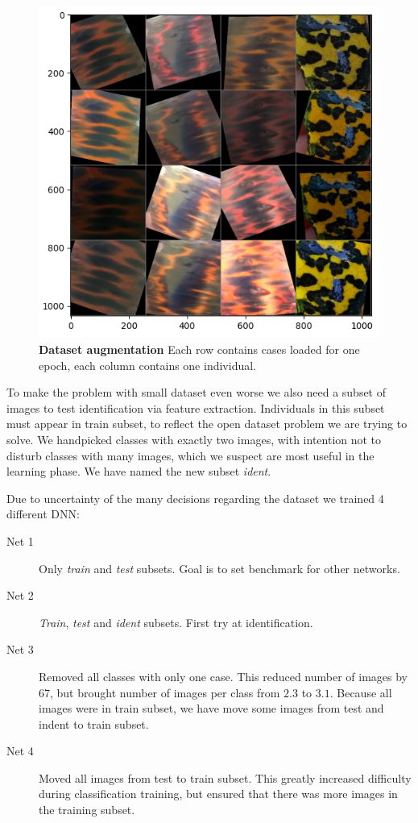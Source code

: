 \documentclass[fleqn,moreauthors,10pt]{ds_report}
\begin{document}
\begin{figure}[htb]\centering
	\includegraphics[width=0.8\linewidth]{augmentation.png}
	\caption{\textbf{Dataset augmentation} Each row contains cases loaded for one epoch, each column contains one individual.}
	\label{fig:augmentation}
\end{figure}

To make the problem with small dataset even worse we also need a subset of images to test identification via feature extraction. Individuals in this subset must appear in train subset, to reflect the open dataset problem we are trying to solve. We handpicked classes with exactly two images, with intention not to disturb classes with many images, which we suspect are most useful in the learning phase. We have named the new subset \textit{ident}.

Due to uncertainty of the many decisions regarding the dataset we trained 4 different DNN:
\begin{description}
	\item[Net 1] Only \textit{train} and \textit{test} subsets. Goal is to set benchmark for other networks.
	\item[Net 2] \textit{Train}, \textit{test} and \textit{ident} subsets. First try at identification. 
	\item[Net 3] Removed all classes with only one case. This reduced number of images by 67, but brought number of images per class from $2.3$ to $3.1$. Because all images were in train subset, we have move some images from test and indent to train subset.
	\item[Net 4] Moved all images from test to train subset. This greatly increased difficulty during classification training, but ensured that there was more images in the training subset.
\end{description}
\end{document}
